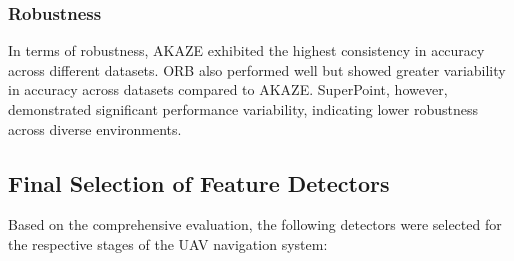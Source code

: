 \subsubsection*{Robustness}

In terms of robustness, AKAZE exhibited the highest consistency in accuracy across different datasets. ORB also performed well but showed greater variability in accuracy across datasets compared to AKAZE. SuperPoint, however, demonstrated significant performance variability, indicating lower robustness across diverse environments.

\subsection{Final Selection of Feature Detectors}

Based on the comprehensive evaluation, the following detectors were selected for the respective stages of the UAV navigation system:

